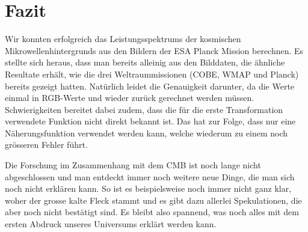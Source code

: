 \section{Fazit}

Wir konnten erfolgreich das Leistungsspektrums der kosmischen 
Mikrowellenhintergrunds aus den Bildern der ESA Planck Mission berechnen. Es 
stellte sich heraus, dass man bereits alleinig aus den Bilddaten, die ähnliche 
Resultate erhält, wie die drei Weltraummissionen (COBE, WMAP und Planck) 
bereits gezeigt hatten. Natürlich leidet die Genauigkeit darunter, da die Werte 
einmal in RGB-Werte und wieder zurück gerechnet werden müssen. Schwierigkeiten 
bereitet dabei zudem, dass die für die erste Transformation verwendete Funktion 
nicht direkt bekannt ist. Das hat zur Folge, dass nur eine Näherungsfunktion 
verwendet werden kann, welche wiederum zu einem noch grösseren Fehler führt.

Die Forschung im Zusammenhang mit dem CMB ist noch lange nicht abgeschlossen 
und man entdeckt immer noch weitere neue Dinge, die man sich noch nicht 
erklären kann. So ist es beispielsweise noch immer nicht ganz klar, woher der 
grosse kalte Fleck stammt und es gibt dazu allerlei Spekulationen, die aber 
noch nicht bestätigt sind. Es bleibt also spannend, was noch alles mit dem 
ersten Abdruck unseres Universums erklärt werden kann.

